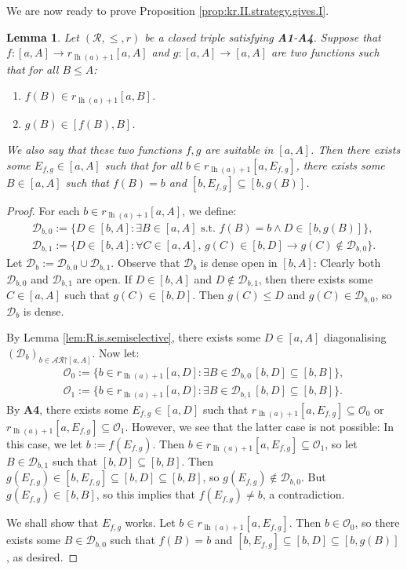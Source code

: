 \documentclass[11pt,reqno]{amsart}
\theoremstyle{plain}
\numberwithin{equation}{section}
\newtheorem{lemma}[theorem]{Lemma}
\theoremstyle{definition}
\newcommand{\func}{\operatorname}
\newcommand{\cal}{\mathcal}
\newcommand{\restrictedto}{\mathord{\upharpoonright}}
\newcommand{\lh}{\func{lh}}
\renewcommand{\O}{\cal{O}}
\newcommand{\D}{\cal{D}}
\begin{document}
We are now ready to prove Proposition \ref{prop:kr.II.strategy.gives.I}.

\begin{lemma}
\label{lem:diagonalise.suitable.functions}
    Let $(\cal{R},\leq,r)$ be a closed triple satisfying \textbf{A1}-\textbf{A4}. Suppose that $f : [a,A] \to r_{\lh(a)+1}[a,A]$ and $g : [a,A] \to [a,A]$ are two functions such that for all $B \leq A$:
    \begin{enumerate}
        \item $f(B) \in r_{\lh(a)+1}[a,B]$.

        \item $g(B) \in [f(B),B]$.
    \end{enumerate}
    We also say that these two functions $f,g$ are \emph{suitable} in $[a,A]$. Then there exists some $E_{f,g} \in [a,A]$ such that for all $b \in r_{\lh(a)+1}[a,E_{f,g}]$, there exists some $B \in [a,A]$ such that $f(B) = b$ and $[b,E_{f,g}] \subseteq [b,g(B)]$. 
\end{lemma}

\begin{proof}
    For each $b \in r_{\lh(a)+1}[a,A]$, we define:
    \begin{align*}
        \D_{b,0} := \{D \in [b,A] : \exists B \in [a,A] \text{ s.t. } f(B) = b \wedge D \in [b,g(B)]\}, \\
        \D_{b,1} := \{D \in [b,A] : \forall C \in [a,A], \, g(C) \in [b,D] \to g(C) \notin \D_{b,0}\}.
    \end{align*}
    Let $\D_b := \D_{b,0} \cup \D_{b,1}$. Observe that $\D_b$ is dense open in $[b,A]$: Clearly both $\D_{b,0}$ and $\D_{b,1}$ are open. If $D \in [b,A]$ and $D \notin \D_{b,1}$, then there exists some $C \in [a,A]$ such that $g(C) \in [b,D]$. Then $g(C) \leq D$ and $g(C) \in \D_{b,0}$, so $\D_b$ is dense.

    By Lemma \ref{lem:R.is.semiselective}, there exists some $D \in [a,A]$ diagonalising $(\D_b)_{b \in \cal{AR}\restrictedto[a,A]}$. Now let:
    \begin{align*}
        \O_0 := \{b \in r_{\lh(a)+1}[a,D] : \exists B \in \D_{b,0} \, [b,D] \subseteq [b,B]\}, \\
        \O_1 := \{b \in r_{\lh(a)+1}[a,D] : \exists B \in \D_{b,1} \, [b,D] \subseteq [b,B]\}.
    \end{align*}
    By \textbf{A4}, there exists some $E_{f,g} \in [a,D]$ such that $r_{\lh(a)+1}[a,E_{f,g}] \subseteq \O_0$ or $r_{\lh(a)+1}[a,E_{f,g}] \subseteq \O_1$. However, we see that the latter case is not possible: In this case, we let $b := f(E_{f,g})$. Then $b \in r_{\lh(a)+1}[a,E_{f,g}] \subseteq \O_1$, so let $B \in \D_{b,1}$ such that $[b,D] \subseteq [b,B]$. Then $g(E_{f,g}) \in [b,E_{f,g}] \subseteq [b,D] \subseteq [b,B]$, so $g(E_{f,g}) \notin \D_{b,0}$. But $g(E_{f,g}) \in [b,B]$, so this implies that $f(E_{f,g}) \neq b$, a contradiction.

    We shall show that $E_{f,g}$ works. Let $b \in r_{\lh(a)+1}[a,E_{f,g}]$. Then $b \in \O_0$, so there exists some $B \in \D_{b,0}$ such that $f(B) = b$ and $[b,E_{f,g}] \subseteq [b,D] \subseteq [b,g(B)]$, as desired.
\end{proof}
\end{document}
